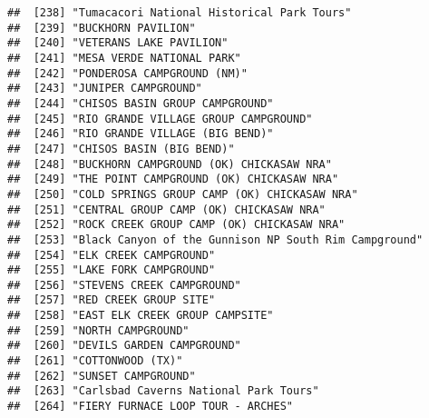 \documentclass[
]{article}
\begin{document}
\begin{verbatim}
##  [238] "Tumacacori National Historical Park Tours"                                           
##  [239] "BUCKHORN PAVILION"                                                                   
##  [240] "VETERANS LAKE PAVILION"                                                              
##  [241] "MESA VERDE NATIONAL PARK"                                                            
##  [242] "PONDEROSA CAMPGROUND (NM)"                                                           
##  [243] "JUNIPER CAMPGROUND"                                                                  
##  [244] "CHISOS BASIN GROUP CAMPGROUND"                                                       
##  [245] "RIO GRANDE VILLAGE GROUP CAMPGROUND"                                                 
##  [246] "RIO GRANDE VILLAGE (BIG BEND)"                                                       
##  [247] "CHISOS BASIN (BIG BEND)"                                                             
##  [248] "BUCKHORN CAMPGROUND (OK) CHICKASAW NRA"                                              
##  [249] "THE POINT CAMPGROUND (OK) CHICKASAW NRA"                                             
##  [250] "COLD SPRINGS GROUP CAMP (OK) CHICKASAW NRA"                                          
##  [251] "CENTRAL GROUP CAMP (OK) CHICKASAW NRA"                                               
##  [252] "ROCK CREEK GROUP CAMP (OK) CHICKASAW NRA"                                            
##  [253] "Black Canyon of the Gunnison NP South Rim Campground"                                
##  [254] "ELK CREEK CAMPGROUND"                                                                
##  [255] "LAKE FORK CAMPGROUND"                                                                
##  [256] "STEVENS CREEK CAMPGROUND"                                                            
##  [257] "RED CREEK GROUP SITE"                                                                
##  [258] "EAST ELK CREEK GROUP CAMPSITE"                                                       
##  [259] "NORTH CAMPGROUND"                                                                    
##  [260] "DEVILS GARDEN CAMPGROUND"                                                            
##  [261] "COTTONWOOD (TX)"                                                                     
##  [262] "SUNSET CAMPGROUND"                                                                   
##  [263] "Carlsbad Caverns National Park Tours"                                                
##  [264] "FIERY FURNACE LOOP TOUR - ARCHES"                                                    

\end{verbatim}
\end{document}
